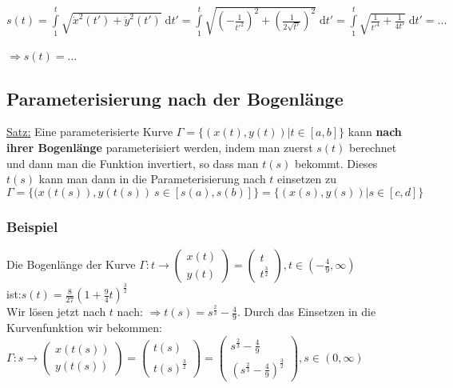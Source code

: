 \documentclass[11pt]{article} %
\begin{document}
$s(t) =  \int \limits_1^t \sqrt{\dot x^2(t') + \dot y^2(t')} \; \text{d}t'  = \int \limits_1^t \sqrt{ (-\frac{1}{t'^2})^2+ (\frac{1}{2\sqrt{t'}})^2 } \; \text{d}t' = \int \limits_1^t \sqrt{ \frac{1}{t'^4}+ \frac{1}{4t'} } \; \text{d}t' = ...$\\\\
$\Rightarrow s(t) = ...$
 
\subsection{Parameterisierung nach der Bogenlänge}

\underline{Satz:} Eine parameterisierte Kurve $\Gamma = \{(x(t),y(t)) |t \in [a,b] \}$ kann {\bf nach ihrer Bogenlänge} parameterisiert werden, indem man zuerst $s(t)$ berechnet und dann man die Funktion invertiert, so dass man $t(s)$ bekommt. Dieses $t(s)$ kann man dann in die Parameterisierung nach $t$ einsetzen zu $\Gamma = \{ (x(t(s)),y(t(s)) \ s \in [s(a), s(b)]\} = \{ (x(s), y(s)) | s \in [c , d]\}$

\subsubsection{Beispiel}

Die Bogenlänge der Kurve $\Gamma: t \rightarrow  \left(\!
    \begin{array}{c}
     x(t)   \\
     y(t) 
    \end{array}
  \!\right) = \left(\!
    \begin{array}{c}
     t   \\
     t^\frac{3}{2}
    \end{array}
  \!\right), t \in (-\frac{4}{9}, \infty)$\\ ist:$s(t) = \frac{8}{27}(1+\frac{9}{4}t)^\frac{3}{2}$\\

Wir lösen jetzt nach $t$ nach: $ \Rightarrow t(s) = s^\frac{2}{3} - \frac{4}{9}$. Durch das Einsetzen in die Kurvenfunktion wir bekommen:\\

$\Gamma: s \rightarrow  \left(\!
    \begin{array}{c}
     x(t(s))   \\
     y(t(s)) 
    \end{array}
  \!\right) = \left(\!
    \begin{array}{c}
     t(s)   \\
     t(s)^\frac{3}{2}
    \end{array}
  \!\right) = \left(\!
    \begin{array}{c}
     s^\frac{2}{3} - \frac{4}{9}   \\
     (s^\frac{2}{3} - \frac{4}{9})^\frac{3}{2}
    \end{array}
  \!\right), s \in (0, \infty)$\\
\end{document}
